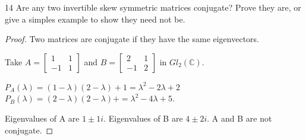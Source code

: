 \documentclass{article}
\newcommand{\C}{\mathbb{C}}
\begin{document}
\bigskip

\begin{PROB}{14}\label{Problem 14.}
    Are any two invertible skew symmetric matrices conjugate? Prove they are, or give a simples example to show they need not be. 
\end{PROB}
\begin{proof}
    Two matrices are conjugate if they have the same eigenvectors. 

    Take $A = \begin{bmatrix}
        1 & 1 \\ -1 & 1
    \end{bmatrix}$ and $B = \begin{bmatrix}
        2 & 1 \\ -1 & 2
    \end{bmatrix}$ in $Gl_2(\C)$. 
    
    $P_A(\lambda) = (1 - \lambda)(2 - \lambda) + 1 = \lambda^2 - 2\lambda + 2$
    $P_B(\lambda) = (2 - \lambda)(2 - \lambda) + = \lambda^2 - 4\lambda + 5$. 

    Eigenvalues of A are $1 \pm 1i$. Eigenvalues of B are $4 \pm 2i$. A and B are not conjugate.

       
\end{proof}
\end{document}
